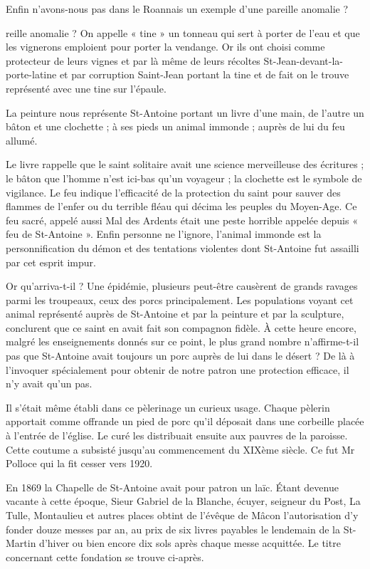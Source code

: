Enfin n'avons-nous pas dans le Roannais un exemple d'une pareille anomalie ?

reille anomalie ? On appelle « tine » un tonneau qui sert à porter de l'eau et que les vignerons emploient pour porter la vendange. Or ils ont choisi comme protecteur de leurs vignes et par là même de leurs récoltes St-Jean-devant-la-porte-latine et par corruption Saint-Jean portant la tine et de fait on le trouve représenté avec une tine sur l'épaule.

La peinture nous représente St-Antoine portant un livre d'une main, de l'autre un bâton et une clochette ; à ses pieds un animal immonde ; auprès de lui du feu allumé.

Le livre rappelle que le saint solitaire avait une science merveilleuse des écritures ; le bâton que l'homme n'est ici-bas qu'un voyageur ; la clochette est le symbole de vigilance. Le feu indique l'efficacité de la protection du saint pour sauver des flammes de l'enfer ou du terrible fléau qui décima les peuples du Moyen-Age. Ce feu sacré, appelé aussi Mal des Ardents était une peste horrible appelée depuis « feu de St-Antoine ». Enfin personne ne l'ignore, l'animal immonde est la personnification du démon et des tentations violentes dont St-Antoine fut assailli par cet esprit impur.

Or qu'arriva-t-il ? Une épidémie, plusieurs peut-être causèrent de grands ravages parmi les troupeaux, ceux des porcs principalement. Les populations voyant cet animal représenté auprès de St-Antoine et par la peinture et par la sculpture, conclurent que ce saint en avait fait son compagnon fidèle. À cette heure encore, malgré les enseignements donnés sur ce point, le plus grand nombre n'affirme-t-il pas que St-Antoine avait toujours un porc auprès de lui dans le désert ? De là à l'invoquer spécialement pour obtenir de notre patron une protection efficace, il n'y avait qu'un pas.

Il s'était même établi dans ce pèlerinage un curieux usage. Chaque pèlerin apportait comme offrande un pied de porc qu'il déposait dans une corbeille placée à l'entrée de l'église. Le curé les distribuait ensuite aux pauvres de la paroisse. Cette coutume a subsisté jusqu'au commencement du XIXème siècle. Ce fut Mr Polloce qui la fit cesser vers 1920.

En 1869 la Chapelle de St-Antoine avait pour patron un laïc. Étant devenue vacante à cette époque, Sieur Gabriel de la Blanche, écuyer,
seigneur du Post, La Tulle, Montaulieu et autres places obtint de l'évêque de Mâcon l'autorisation d'y fonder douze messes par an, au prix de six livres payables le lendemain de la St-Martin d'hiver ou bien encore dix sols après chaque messe acquittée. Le titre concernant cette fondation se trouve ci-après.

